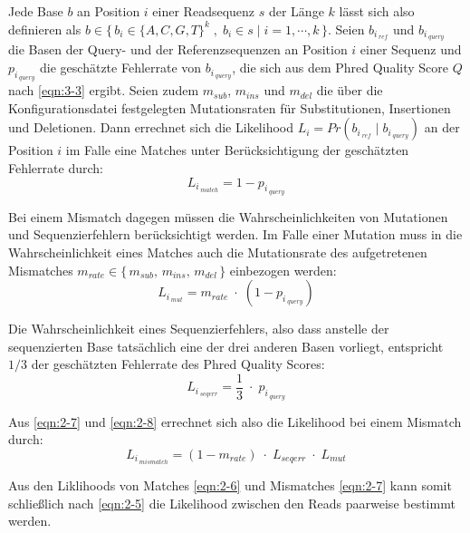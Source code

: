 Jede Base $ b $ an Position $ i $ einer Readsequenz $ s $ der Länge $ k $ lässt sich also definieren als $ b \in \{\,b_{i}\in \{A,C,G,T\}^k\;,\; b_{i} \in s \;|\; i = 1, \dotsb, k \,\}$. Seien $ b_{i\,_{ref}} $ und $ b_{i\,_{query}} $ die Basen der Query- und der Referenzsequenzen an Position $ i $ einer Sequenz und $  p_{i\,_{query}} $ die geschätzte Fehlerrate von $ b_{i\,_{query}} $, die sich aus dem Phred Quality Score $ Q $ nach  \eqref{eqn:3-3} ergibt. Seien zudem $ m_{sub} $, $ m_{ins} $ und $ m_{del} $ die über die Konfigurationsdatei festgelegten Mutationsraten für Substitutionen, Insertionen und Deletionen. Dann errechnet sich die Likelihood $ L_{i} = Pr(b_{i\,_{ref}}\;|\; b_{i\,_{query}})$ an der Position $ i $ im Falle eine Matches unter Berücksichtigung der geschätzten Fehlerrate durch:
\begin{equation} \label{eqn:2-6}
\tag{2-6}
L_{i\,_{match}} = 1 - p_{i\,_{query}}
\end{equation}

Bei einem Mismatch dagegen müssen die Wahrscheinlichkeiten von Mutationen und Sequenzierfehlern berücksichtigt werden. Im Falle einer Mutation muss in die Wahrscheinlichkeit eines Matches auch die Mutationsrate des aufgetretenen Mismatches $ m_{rate} \in \{\,m_{sub},\,  m_{ins},\, m_{del}\,\} $ einbezogen werden:
\begin{equation} \label{eqn:2-7}
\tag{2-7}
L_{i\,_{mut}} = m_{rate}\; \cdotp \;(1 - p_{i\,_{query}})
\end{equation}

Die Wahrscheinlichkeit eines Sequenzierfehlers, also dass anstelle der sequenzierten Base tatsächlich eine der drei anderen Basen vorliegt, entspricht $ 1/3 $ der geschätzten Fehlerrate des Phred Quality Scores:
\begin{equation} \label{eqn:2-8}
\tag{2-8}
L_{i\,_{seqerr}} = \frac{1}{3} \; \cdotp \; p_{i\,_{query}}
\end{equation}

Aus \eqref{eqn:2-7} und \eqref{eqn:2-8} errechnet sich also die Likelihood bei einem Mismatch durch:
\begin{equation} \label{eqn:2-9}
\tag{2-9}
L_{i\,_{mismatch}} = (1-m_{rate}) \; \cdotp \; L_{seqerr} \; \cdotp \; L_{mut}
\end{equation}

Aus den Liklihoods von Matches \eqref{eqn:2-6} und Mismatches \eqref{eqn:2-7} kann somit schließlich nach \eqref{eqn:2-5} die Likelihood zwischen den Reads paarweise bestimmt werden.\\

